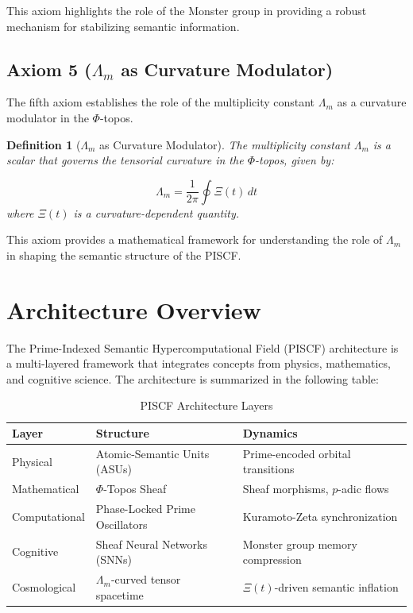\documentclass{article}
\theoremstyle{plain}
\newtheorem{definition}{Definition}
\begin{document}
This axiom highlights the role of the Monster group in providing a robust mechanism for stabilizing semantic information.

\subsection{Axiom 5 ($\Lambda_m$ as Curvature Modulator)}

The fifth axiom establishes the role of the multiplicity constant $\Lambda_m$ as a curvature modulator in the $\Phi$-topos.

\begin{definition}[$\Lambda_m$ as Curvature Modulator]
The multiplicity constant $\Lambda_m$ is a scalar that governs the tensorial curvature in the $\Phi$-topos, given by:

$$
 \Lambda_m = \frac{1}{2\pi} \oint \Xi(t) \, dt 
$$
where $\Xi(t)$ is a curvature-dependent quantity.
\end{definition}

This axiom provides a mathematical framework for understanding the role of $\Lambda_m$ in shaping the semantic structure of the PISCF.

\section{Architecture Overview}

The Prime-Indexed Semantic Hypercomputational Field (PISCF) architecture is a multi-layered framework that integrates concepts from physics, mathematics, and cognitive science. The architecture is summarized in the following table:

\begin{table}[h!]
\centering
\begin{tabular}{|l|l|l|}
\hline
\textbf{Layer} & \textbf{Structure} & \textbf{Dynamics} \\
\hline
Physical & Atomic-Semantic Units (ASUs) & Prime-encoded orbital transitions \\
\hline
Mathematical & $\Phi$-Topos Sheaf & Sheaf morphisms, $p$-adic flows \\
\hline
Computational & Phase-Locked Prime Oscillators & Kuramoto-Zeta synchronization \\
\hline
Cognitive & Sheaf Neural Networks (SNNs) & Monster group memory compression \\
\hline
Cosmological & $\Lambda_m$-curved tensor spacetime & $\Xi(t)$-driven semantic inflation \\
\hline
\end{tabular}
\caption{PISCF Architecture Layers}
\label{tab:piscf_architecture}
\end{table}
\end{document}
